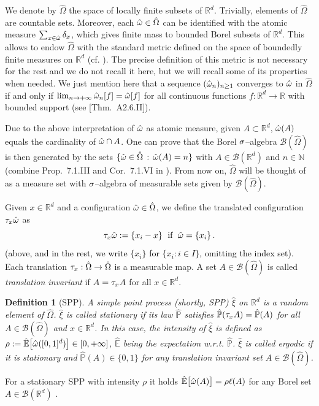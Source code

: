\documentclass[12pt,a4paper,reqno]{amsart}
\newtheorem{Definition}[Theorem]{Definition}
\newcommand{\cB}{\ensuremath{\mathcal B}}
\newcommand{\bbE}{{\ensuremath{\mathbb E}} }
\newcommand{\bbN}{{\ensuremath{\mathbb N}} }
\newcommand{\bbP}{{\ensuremath{\mathbb P}} }
\newcommand{\bbR}{{\ensuremath{\mathbb R}} }
\let\O=\Omega \let\P=\Pi   \let\Ps=\Psi \let\Si=\Sigma \let\X=\Xi
\newcommand{\rosso}{\textcolor{black}} %
\newcommand{\be}{\begin{equation}}
\newcommand{\en}{\end{equation}}
\begin{document}
 
 We denote by $\hat \O$ the space of  locally finite subsets of $\bbR^d$. Trivially, elements of $\hat \O$ are countable sets. Moreover, each $\hat \o \in \hat \O$ can be identified with the atomic measure $\sum_{x\in \hat {\omega} }\delta_x$, which  gives finite mass to bounded Borel subsets of $\bbR^d$. This allows to endow $\hat \O$ with the standard metric defined on the space of boundedly finite measures on $\bbR^d$ (cf. \cite[Eq.~(A2.6.1) in Appendix~A2.6]{DV}). The precise definition of this metric is not necessary for the rest and  we do not recall it here, but we will recall some of its properties when needed. We just mention here that a sequence $(\hat{\omega}_n)_{n\geq 1}$  converges to $\hat {\omega}$ in $\hat \O$ if and only if $\lim_{n\to +\infty}\hat{\omega}_n[f]= \hat {\omega}[f]$ for all   continuous  functions $f: \bbR^d\to \bbR$ with bounded  support (see  \cite{DV}[Thm.~A2.6.II]). 
 
 Due to  the above interpretation of $\hat {\omega}$ as atomic measure, 
  given  $A\subset \bbR^d$,  $\hat {\omega} (A)$ equals  the cardinality of $\hat {\omega} \cap A$.
  One can prove that the Borel $\sigma$--algebra $\cB(\hat\O)$ is then generated by the sets $  \{\hat \o \in \hat \O\,:\, \hat \o (A) =n\} $ with $A\in \cB(\bbR^d)$ and $n \in \bbN$ (combine Prop.~7.1.III and  Cor.~7.1.VI in \cite{DV}).  From now on, $\hat \O$ will be thought of  as a measure set with $\sigma$--algebra of  measurable sets given by $\cB(\hat \O)$. 
 
 
   Given $x\in\bbR^d$ and a  configuration $ \hat \o\in\hat \O$, we define the translated configuration $\tau_x\hat {\omega}$  as
\be\label{traslare}
\t_x\hat \o:= \{ x_i-x \}\; \text{ if }\; \hat \o=\{ x_i\}\,.
\en
\rosso{(above, and in the rest, we write $\{x_i\}$ for $\{x_i:i\in I\}$, omitting the index set).}
Each translation $\t_x:\hat\O\to \hat\O$ is a measurable map.
 A set $A\in \cB(\hat\O)$ is called \emph{translation invariant} if $A=\tau_x A$ for all $x\in \bbR^d$.
 
 \begin{Definition}[SPP] \label{def_spp}
 A \emph{simple point process} (shortly, SPP) $\hat \xi$ on $\bbR^d$ is a random element of $\hat \O$. 
 $\hat \xi$ is called \emph{stationary} if its law $\hat \bbP$ satisfies $\hat \bbP( \t_x A)=\hat \bbP(A)$ for all $A\in \cB(\hat \O)$ and $x\in \bbR^d$. In this case, the \emph{intensity} of $\hat \xi$ is defined as $\rho:=\hat \bbE\bigl[ \hat\o([0,1]^d) \bigr]\in [0,+\infty]$, $\hat \bbE$ being the expectation w.r.t. $\hat \bbP$.
$\hat \xi$  is called \emph{ergodic} if it is stationary  and  $\hat \bbP(A)\in \{0,1\}$ for any translation invariant set $A\in \cB(\hat \O)$. 
\end{Definition}
For a stationary SPP with intensity $\rho$ it holds  $\hat \bbE\bigl[ \hat\o(A) \bigr]= \rho \ell(A)$ for any Borel set $A\in \cB (\bbR^d)$ \cite{DV}.
 
\end{document}
